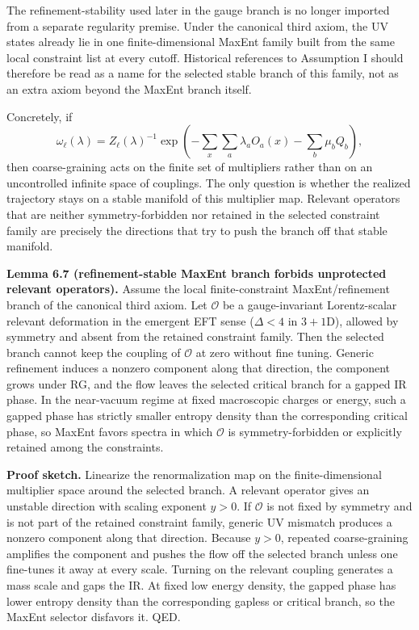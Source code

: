 The refinement-stability used later in the gauge branch is no longer imported from a separate regularity premise. Under the canonical third axiom, the UV states already lie in one finite-dimensional MaxEnt family built from the same local constraint list at every cutoff. Historical references to Assumption I should therefore be read as a name for the selected stable branch of this family, not as an extra axiom beyond the MaxEnt branch itself.

Concretely, if
\[
\omega_\ell(\lambda)
=
Z_\ell(\lambda)^{-1}
\exp\!\left(
-\sum_x \sum_a \lambda_a O_a(x)-\sum_b \mu_b Q_b
\right),
\]
then coarse-graining acts on the finite set of multipliers rather than on an uncontrolled infinite space of couplings. The only question is whether the realized trajectory stays on a stable manifold of this multiplier map. Relevant operators that are neither symmetry-forbidden nor retained in the selected constraint family are precisely the directions that try to push the branch off that stable manifold.

\textbf{Lemma 6.7 (refinement-stable MaxEnt branch forbids unprotected relevant operators).} Assume the local finite-constraint MaxEnt/refinement branch of the canonical third axiom. Let \(\mathcal{O}\) be a gauge-invariant Lorentz-scalar relevant deformation in the emergent EFT sense (\(\Delta<4\) in \(3+1\)D), allowed by symmetry and absent from the retained constraint family. Then the selected branch cannot keep the coupling of \(\mathcal{O}\) at zero without fine tuning. Generic refinement induces a nonzero component along that direction, the component grows under RG, and the flow leaves the selected critical branch for a gapped IR phase. In the near-vacuum regime at fixed macroscopic charges or energy, such a gapped phase has strictly smaller entropy density than the corresponding critical phase, so MaxEnt favors spectra in which \(\mathcal{O}\) is symmetry-forbidden or explicitly retained among the constraints.

\textbf{Proof sketch.} Linearize the renormalization map on the finite-dimensional multiplier space around the selected branch. A relevant operator gives an unstable direction with scaling exponent \(y>0\). If \(\mathcal{O}\) is not fixed by symmetry and is not part of the retained constraint family, generic UV mismatch produces a nonzero component along that direction. Because \(y>0\), repeated coarse-graining amplifies the component and pushes the flow off the selected branch unless one fine-tunes it away at every scale. Turning on the relevant coupling generates a mass scale and gaps the IR. At fixed low energy density, the gapped phase has lower entropy density than the corresponding gapless or critical branch, so the MaxEnt selector disfavors it. QED.

